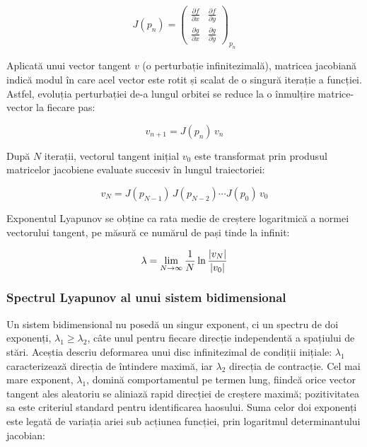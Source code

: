 \begin{equation}
    J(p_n) =
    \begin{pmatrix}
        \frac{\partial f}{\partial x} & \frac{\partial f}{\partial y} \\[6pt]
        \frac{\partial g}{\partial x} & \frac{\partial g}{\partial y}
    \end{pmatrix}_{p_n}
\end{equation}

Aplicată unui vector tangent $v$ (o perturbație infinitezimală), matricea jacobiană indică modul în care acel vector este rotit și scalat de o singură iterație a funcției.
Astfel, evoluția perturbației de-a lungul orbitei se reduce la o înmulțire matrice-vector la fiecare pas:

\begin{equation}
    v_{n+1} = J(p_n) \, v_n
\end{equation}

După $N$ iterații, vectorul tangent inițial $v_0$ este transformat prin produsul matricelor jacobiene evaluate succesiv în lungul traiectoriei:

\begin{equation}
    v_N = J(p_{N-1}) \, J(p_{N-2}) \cdots J(p_0) \, v_0
\end{equation}

Exponentul Lyapunov se obține ca rata medie de creștere logaritmică a normei vectorului tangent, pe măsură ce numărul de pași tinde la infinit:

\begin{equation}
    \lambda = \lim_{N \to \infty} \frac{1}{N} \ln \frac{\lvert v_N\rvert}{\lvert v_0\rvert}
\end{equation}

\subsubsection{Spectrul Lyapunov al unui sistem bidimensional}

Un sistem bidimensional nu posedă un singur exponent, ci un spectru de doi exponenți, $\lambda_1 \geq \lambda_2$, câte unul pentru fiecare direcție independentă a spațiului de stări.
Aceștia descriu deformarea unui disc infinitezimal de condiții inițiale: $\lambda_1$ caracterizează direcția de întindere maximă, iar $\lambda_2$ direcția de contracție.
Cel mai mare exponent, $\lambda_1$, domină comportamentul pe termen lung, fiindcă orice vector tangent ales aleatoriu se aliniază rapid direcției de creștere maximă; pozitivitatea sa este criteriul standard pentru identificarea haosului.
Suma celor doi exponenți este legată de variația ariei sub acțiunea funcției, prin logaritmul determinantului jacobian:

